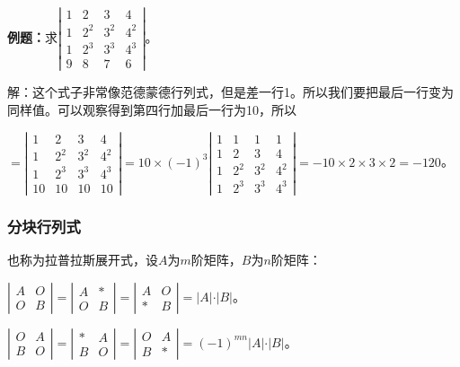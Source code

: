 \textbf{例题：}求$\left|\begin{array}{cccc} 
    1 & 2 & 3 & 4 \\
    1 & 2^2  & 3^2 & 4^2 \\
    1 & 2^3  & 3^3 & 4^3 \\
    9 & 8 & 7 & 6
\end{array}\right|$。

解：这个式子非常像范德蒙德行列式，但是差一行1。所以我们要把最后一行变为同样值。可以观察得到第四行加最后一行为10，所以

$=\left|\begin{array}{cccc} 
    1 & 2 & 3 & 4 \\
    1 & 2^2  & 3^2 & 4^2 \\
    1 & 2^3  & 3^3 & 4^3 \\
    10 & 10 & 10 & 10
\end{array}\right|=10\times(-1)^3\left|\begin{array}{cccc} 
    1 & 1 & 1 & 1 \\
    1 & 2 & 3 & 4 \\
    1 & 2^2  & 3^2 & 4^2 \\
    1 & 2^3  & 3^3 & 4^3
\end{array}\right|=-10\times2\times3\times2=-120$。

\subsubsection{分块行列式}

也称为拉普拉斯展开式，设$A$为$m$阶矩阵，$B$为$n$阶矩阵：\medskip

$\left|\begin{array}{cc}
    A & O \\
    O & B
\end{array}\right|=
\left|\begin{array}{cc}
    A & * \\
    O & B
\end{array}\right|=
\left|\begin{array}{cc}
    A & O \\
    * & B
\end{array}\right|=\vert A\vert\cdot\vert B\vert$。

$\left|\begin{array}{cc}
    O & A \\
    B & O
\end{array}\right|=
\left|\begin{array}{cc}
    * & A \\
    B & O
\end{array}\right|=
\left|\begin{array}{cc}
    O & A \\
    B & *
\end{array}\right|=(-1)^{mn}\vert A\vert\cdot\vert B\vert$。

